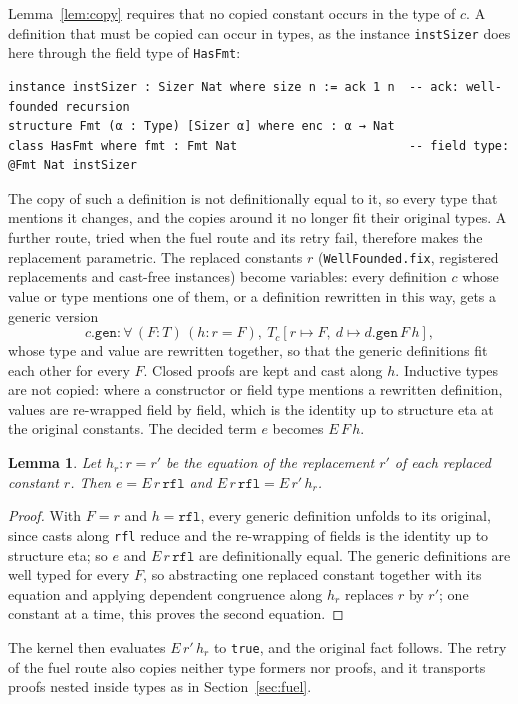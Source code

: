 \documentclass[11pt]{article}
\newtheorem{lemma}{Lemma}
\begin{document}
Lemma~\ref{lem:copy} requires that no copied constant occurs in the type of \(c\). A definition that must be
copied can occur in types, as the instance \texttt{instSizer} does here through the field type of
\texttt{HasFmt}:

\noindent\begin{minipage}{\linewidth}
\begin{lstlisting}
instance instSizer : Sizer Nat where size n := ack 1 n  -- ack: well-founded recursion
structure Fmt (α : Type) [Sizer α] where enc : α → Nat
class HasFmt where fmt : Fmt Nat                        -- field type: @Fmt Nat instSizer
\end{lstlisting}
\end{minipage}
The copy of such a definition is not definitionally equal to it, so every type that mentions it changes, and
the copies around it no longer fit their original types. A further route, tried when the fuel route and its
retry fail, therefore makes the replacement parametric. The replaced constants
\(r\) (\texttt{WellFounded.fix}, registered replacements and cast-free instances) become variables: every
definition \(c\) whose value or type mentions one of them, or a definition rewritten in this way, gets a
generic version
\[c.\mathtt{gen} : \forall\,(F : T)\,(h : r = F),\ T_c[r \mapsto F,\ d \mapsto d.\mathtt{gen}\,F\,h],\]
whose type and value are rewritten together, so that the generic definitions fit each other for every \(F\).
Closed proofs are kept and cast along \(h\). Inductive types are not copied: where a constructor or field type
mentions a rewritten definition, values are re-wrapped field by field, which is the identity up to structure
eta at the original constants. The decided term \(e\) becomes \(E\,F\,h\).

\begin{lemma}\label{lem:param}
Let \(h_r : r = r'\) be the equation of the replacement \(r'\) of each replaced constant \(r\). Then
\(e = E\,r\,\mathtt{rfl}\) and \(E\,r\,\mathtt{rfl} = E\,r'\,h_r\).
\end{lemma}
\begin{proof}
With \(F = r\) and \(h = \mathtt{rfl}\), every generic definition unfolds to its original, since casts along
\texttt{rfl} reduce and the re-wrapping of fields is the identity up to structure eta; so \(e\) and
\(E\,r\,\mathtt{rfl}\) are definitionally equal. The generic definitions are well typed for every \(F\), so
abstracting one replaced constant together with its equation and applying dependent congruence along \(h_r\)
replaces \(r\) by \(r'\); one constant at a time, this proves the second equation.
\end{proof}
\noindent The kernel then evaluates \(E\,r'\,h_r\) to \texttt{true}, and the original fact follows. The retry
of the fuel route also copies neither type formers nor proofs, and it transports proofs nested inside types as
in Section~\ref{sec:fuel}.
\end{document}
